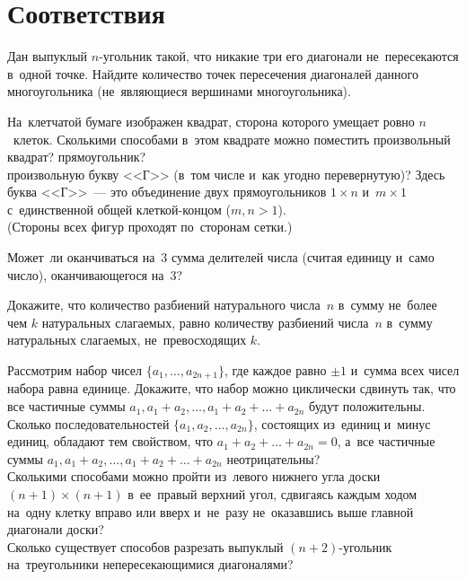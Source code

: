 
\section*{Соответствия}


\begin{problems}

\item
Дан выпуклый $n$-угольник такой, что никакие три его диагонали не~пересекаются
в~одной точке.
Найдите количество точек пересечения диагоналей данного многоугольника
(не~являющиеся вершинами многоугольника).

\item
На~клетчатой бумаге изображен квадрат, сторона которого умещает ровно
$n$~клеток.
Сколькими способами в~этом квадрате можно поместить произвольный
\\
\sp квадрат?
\qquad
\sp прямоугольник?
\\
\sp
произвольную букву <<Г>> (в~том числе и~как угодно перевернутую)?
Здесь буква <<Г>>~--- это объединение двух прямоугольников $1 \times n$
и~$m \times 1$ с~единственной общей клеткой-концом ($m, n > 1$).
\\
(Стороны всех фигур проходят по~сторонам сетки.)

\item
Может~ли оканчиваться на~$3$ сумма делителей числа (считая единицу и~само
число), оканчивающегося на~$3$?

\item
Докажите, что количество разбиений натурального числа~$n$ в~сумму не~более чем
$k$ натуральных слагаемых, равно количеству разбиений числа~$n$ в~сумму
натуральных слагаемых, не~превосходящих $k$.


\item
\sp
Рассмотрим набор чисел $\{ a_1, \ldots, a_{2n + 1} \}$, где каждое равно
$\pm 1$ и~сумма всех чисел набора равна единице.
Докажите, что набор можно циклически сдвинуть так, что все частичные суммы
$a_1, a_1 + a_2, \ldots,  a_1 + a_2 + \ldots + a_{2n}$ будут положительны.
\\
\sp
Сколько последовательностей $\{ a_1, a_2, \ldots, a_{2n} \}$, состоящих
из~единиц и~минус единиц, обладают тем свойством, что
$a_1 + a_2 + \ldots + a_{2n} = 0$, а~все частичные суммы
$a_1, a_1 + a_2, \ldots,  a_1 + a_2 + \ldots + a_{2n}$ неотрицательны?
\\
\sp
Сколькими способами можно пройти из~левого нижнего угла доски
$(n + 1) \times (n + 1)$ в~ее~правый верхний угол, сдвигаясь каждым ходом
на~одну клетку вправо или вверх и~не~разу не~оказавшись выше главной диагонали
доски?
\\
\sp
Сколько существует способов разрезать выпуклый $(n + 2)$-угольник
на~треугольники непересекающимися диагоналями?


\end{problems}
